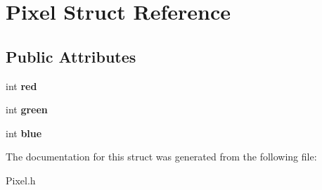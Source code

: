 \hypertarget{structPixel}{}\section{Pixel Struct Reference}
\label{structPixel}
\subsection*{Public Attributes}
\begin{DoxyCompactItemize}
\item 
\mbox{\label{structPixel_a975b9929cee50eba61195c414b9b8420}} 
int {\bfseries red}
\item 
\mbox{\label{structPixel_a729280ab013a63b569b063407239470f}} 
int {\bfseries green}
\item 
\mbox{\label{structPixel_a2145c6cba3e6eb72cb21ed08695fc2f3}} 
int {\bfseries blue}
\end{DoxyCompactItemize}


The documentation for this struct was generated from the following file\+:\begin{DoxyCompactItemize}
\item 
Pixel.\+h\end{DoxyCompactItemize}
